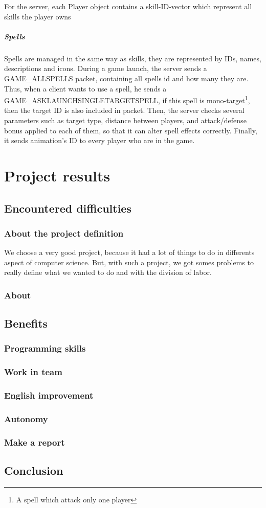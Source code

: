\documentclass{scrreprt}
\begin{document}
				For the server, each Player object contains a skill-ID-vector which represent all skills the player owns %
				\subsubsection{Spells}
				Spells are managed in the same way as skills, they are represented by IDs, names, descriptions and icons. During a game launch, the server sends a GAME\_ALLSPELLS packet, containing all spells id and how many they are. Thus, when a client wants to use a spell, he sends a GAME\_ASKLAUNCHSINGLETARGETSPELL, if this spell is mono-target\footnote{A spell which attack only one player}, then the target ID is also included in packet. Then, the server checks several parameters such as target type, distance between players, and attack/defense bonus applied to each of them, so that it can alter spell effects correctly. Finally, it sends animation's ID to every player who are in the game.


				\part{Project results}
				\chapter{Encountered difficulties}
				\section{About the project definition}
				We choose a very good project, because it had a lot of things to do in differents aspect of computer science. But, with such a project, we got somes problems to really define what we wanted to do and with the division of labor.
				\section{About }
				\chapter{Benefits}
				\section{Programming skills}
				\section{Work in team}
				\section{English improvement}
				\section{Autonomy}
				\section{Make a report}

				\chapter*{Conclusion} %
				
\end{document}
